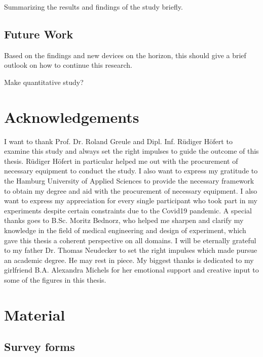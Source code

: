             Summarizing the results and findings of the study briefly.

        \section{Future Work}


            Based on the findings and new devices on the horizon, this should give a brief outlook on how to continue this research.

            Make quantitative study?

    \chapter{Acknowledgements}

        I want to thank Prof. Dr. Roland Greule and Dipl. Inf. Rüdiger Höfert to examine this study and always set the right impulses to guide the outcome of this thesis. Rüdiger Höfert in particular helped me out with the procurement of necessary equipment to conduct the study. I also want to express my gratitude to the Hamburg University of Applied Sciences to provide the necessary framework to obtain my degree and aid with the procurement of necessary equipment. I also want to express my appreciation for every single participant who took part in my experiments despite certain constraints due to the Covid19 pandemic.
        A special thanks goes to B.Sc. Moritz Bednorz, who helped me sharpen and clarify my knowledge in the field of medical engineering and design of experiment, which gave this thesis a coherent perspective on all domains. 
        I will be eternally grateful to my father Dr. Thomas Neudecker to set the right impulses which made pursue an academic degree. He may rest in piece. 
        My biggest thanks is dedicated to my girlfriend B.A. Alexandra Michels for her emotional support and creative input to some of the figures in this thesis.

    \appendix

        \chapter{Material}

            \section{Survey forms}

